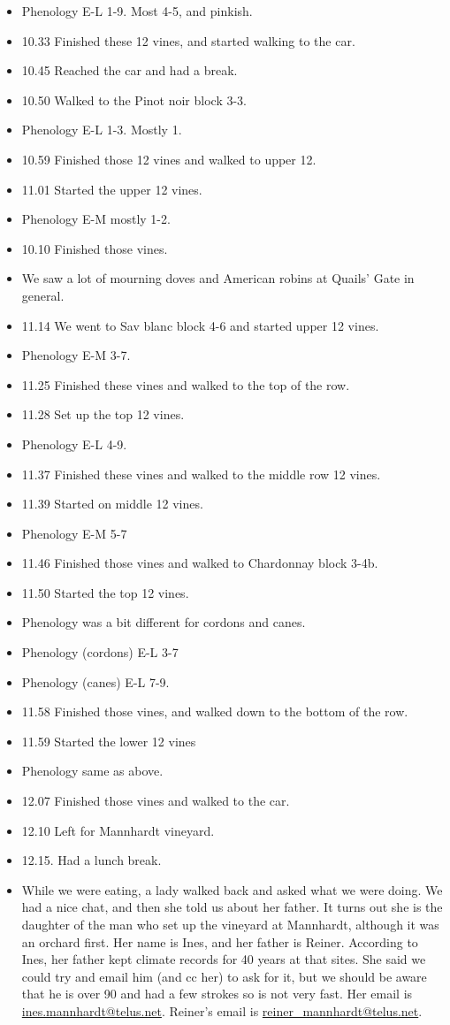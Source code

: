 \documentclass[11pt,letter]{article}
\newenvironment{smitemize}{
\begin{itemize}
  \setlength{\itemsep}{0pt}
  \setlength{\parskip}{0.8pt}
  \setlength{\parsep}{0pt}}
{\end{itemize}
}
\begin{document}
\begin{smitemize}
\item Phenology E-L 1-9. Most 4-5, and pinkish.
\item 10.33 Finished these 12 vines, and started walking to the car. 
\item 10.45 Reached the car and had a break.  
\item 10.50 Walked to the Pinot noir block 3-3.
\item Phenology E-L 1-3. Mostly 1. 
\item 10.59 Finished those 12 vines and walked to upper 12.
\item 11.01 Started the upper 12 vines.
\item Phenology E-M mostly 1-2.
\item 10.10 Finished those vines. 
\item We saw a lot of mourning doves and American robins at Quails' Gate in general. 
\item 11.14 We went to Sav blanc block 4-6 and started upper 12 vines. 
\item Phenology E-M 3-7.
\item 11.25 Finished these vines and walked to the top of the row. 
\item 11.28 Set up the top 12 vines. 
\item Phenology E-L 4-9.
\item 11.37 Finished these vines and walked to the middle row 12 vines.
\item 11.39 Started on middle 12 vines.
\item Phenology E-M 5-7 
\item 11.46 Finished those vines and walked to Chardonnay block 3-4b.
\item 11.50 Started the top 12 vines. 
\item Phenology was a bit different for cordons and canes. 
\item Phenology (cordons) E-L 3-7 
\item Phenology (canes) E-L 7-9.
\item 11.58 Finished those vines, and walked down to the bottom of the row. 
\item 11.59 Started the lower 12 vines
\item Phenology same as above. 
\item 12.07 Finished those vines and walked to the car.
\item 12.10 Left for Mannhardt vineyard.  
\item 12.15. Had a lunch break.
\item While we were eating, a lady walked back and asked what we were doing. We had a nice chat, and then she told us about her father. It turns out she is the daughter of the man who set up the vineyard at Mannhardt, although it was an orchard first. Her name is Ines, and her father is Reiner. According to Ines, her father kept climate records for 40 years at that sites. She said we could try and email him (and cc her) to ask for it, but we should be aware that he is over 90 and had a few strokes so is not very fast. Her email is \href{mailto:ines.mannhardt@telus.net}{ines.mannhardt@telus.net}. Reiner's email is \href{mailto:reiner_mannhardt@telus.net}{reiner\_mannhardt@telus.net}.

\end{smitemize}
\end{document}
